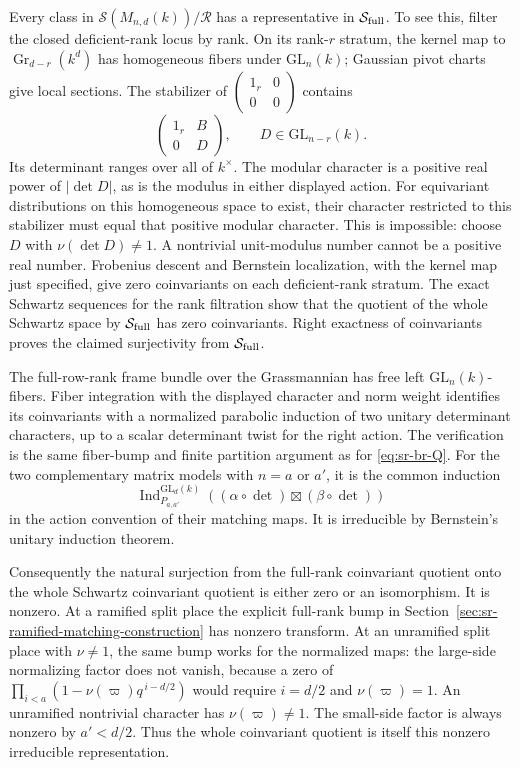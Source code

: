 Every class in \(\mathcal S(M_{n,d}(k))/\mathcal R\)
has a representative in \(\mathcal S_{\rm full}\).
To see this, filter the closed deficient-rank locus by rank.
On its rank-\(r\) stratum, the kernel map to
\(\operatorname{Gr}_{d-r}(k^d)\) has homogeneous fibers under
\(\mathrm{GL}_n(k)\); Gaussian pivot charts give local
sections.  The stabilizer of
\(\left(\begin{smallmatrix}1_r&0\\0&0\end{smallmatrix}\right)\)
contains
\[
                \begin{pmatrix}1_r&B\\0&D\end{pmatrix},
              \qquad D\in\mathrm{GL}_{n-r}(k).
\]
Its determinant ranges over all of \(k^\times\).
The modular character is a positive real power of
\(|\det D|\), as is the modulus in either displayed action.
For equivariant distributions on this homogeneous space to
exist, their character restricted to this stabilizer must
equal that positive modular character.
This is impossible: choose \(D\) with
\(\nu(\det D)\ne1\).  A nontrivial unit-modulus number cannot
be a positive real number.  Frobenius descent and Bernstein
localization, with the kernel map just specified, give zero
coinvariants on each deficient-rank stratum.
The exact Schwartz sequences for the rank filtration show
that the quotient of the whole Schwartz space by
\(\mathcal S_{\rm full}\) has zero coinvariants.
Right exactness of coinvariants proves the claimed
surjectivity from \(\mathcal S_{\rm full}\).

The full-row-rank frame bundle over the Grassmannian has
free left \(\mathrm{GL}_n(k)\)-fibers.
Fiber integration with the displayed character and norm
weight identifies its coinvariants with a normalized
parabolic induction of two unitary determinant characters,
up to a scalar determinant twist for the right action.
The verification is the same fiber-bump and finite
partition argument as for
\eqref{eq:sr-br-Q}.  For the two complementary matrix models
with \(n=a\) or \(a'\), it is the common induction
\[
 \operatorname{Ind}_{P_{a,a'}}^{\mathrm{GL}_d(k)}
          ((\alpha\circ\det)\boxtimes(\beta\circ\det))
\]
in the action convention of their matching maps.
It is irreducible by Bernstein's unitary induction theorem.

Consequently the natural surjection from the full-rank
coinvariant quotient onto the whole Schwartz coinvariant
quotient is either zero or an isomorphism.  It is nonzero.
At a ramified split place the explicit full-rank bump in
Section~\ref{sec:sr-ramified-matching-construction} has
nonzero transform.  At an unramified split place with
\(\nu\ne1\), the same bump works for the normalized maps:
the large-side normalizing factor does not vanish, because
a zero of
\(\prod_{i<a}(1-\nu(\varpi)q^{\,i-d/2})\)
would require \(i=d/2\) and \(\nu(\varpi)=1\).
An unramified nontrivial character has
\(\nu(\varpi)\ne1\).  The small-side factor is always
nonzero by \(a'<d/2\).
Thus the whole coinvariant quotient is itself this nonzero
irreducible representation.


